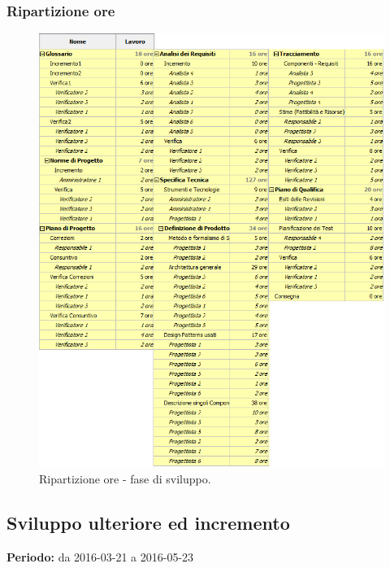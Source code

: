 \documentclass[a4paper]{article}
\begin{document}
			\subsubsection{Ripartizione ore}
				\begin{figure}[H]
					\centering
					\includegraphics[width=\textwidth]{ro_sviluppo}
					\caption{Ripartizione ore - fase di sviluppo.}
				\end{figure}
				
		\subsection{Sviluppo ulteriore ed incremento}
			\textbf{Periodo:} da 2016-03-21 a 2016-05-23 \\
			
\end{document}

